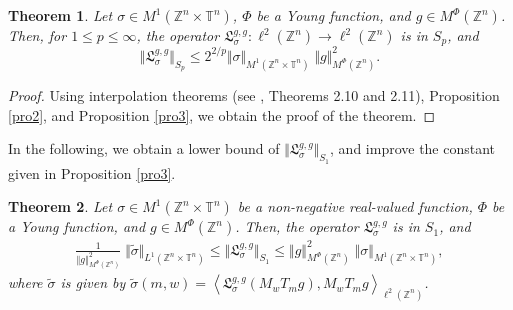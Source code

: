 \documentclass[a4paper,11pt, reqno]{amsart}
\theoremstyle{plain}
\newtheorem{theorem}{Theorem}[section]
\theoremstyle{definition}
\theoremstyle{remark}
\def \Z{{\mathbb Z}}
\def \T{{\mathbb T}}
\begin{document}
\begin{theorem}
Let $\sigma \in  M^1(\Z^n \times \T^n)$, $\Phi$ be a Young function, and $g \in  M^{\Phi}(\Z^n)$. Then, for $1 \leq p \leq \infty$, the operator $\mathfrak{L}^{g, g}_{\sigma}: \ell^2(\Z^n) \to \ell^2(\Z^n)$ is in $S_p$, and 
\[\Vert \mathfrak{L}^{g, g}_{\sigma} \Vert_{S_p} \leq 2^{2/p} \Vert \sigma  \Vert_{M^1(\Z^n \times \T^n)} \;  \Vert g \Vert^{2}_{M^{\Phi}(\Z^n)}.\]
\end{theorem}
\begin{proof}
Using interpolation theorems (see \cite{won02}, Theorems 2.10 and 2.11), Proposition \ref{pro2}, and Proposition \ref{pro3}, we obtain the proof of the theorem.
\end{proof}
In the following, we obtain a lower bound of $\Vert \mathfrak{L}^{g, g}_{\sigma} \Vert_{S_1}$, and improve the constant given in Proposition \ref{pro3}.
\begin{theorem}\label{th4}
Let $\sigma \in M^1(\Z^n \times \T^n)$ be a non-negative real-valued function, $\Phi$ be a Young function, and $g \in  M^{\Phi}(\Z^n)$. Then, the operator $\mathfrak{L}^{g, g}_{\sigma}$ is in $S_1$, and 
\begin{eqnarray*}
\frac{1}{\Vert g \Vert^2_{M^{\Phi}(\Z^n)}}\; \Vert \tilde{\sigma} \Vert_{L^1(\Z^n \times \T^n)}
\leq \Vert \mathfrak{L}^{g, g}_{\sigma} \Vert_{S_1} \leq \Vert g \Vert^2_{M^{\Phi}(\Z^n)} \; \Vert \sigma \Vert_{M^1(\Z^n \times \T^n)},
\end{eqnarray*}
where $\tilde{\sigma}$ is given by $\tilde{\sigma}(m, w)=\left\langle \mathfrak{L}^{g, g}_{\sigma}(M_w T_m g), M_w T_m g \right\rangle_{\ell^2(\Z^n)}$.
\end{theorem}
\end{document}
